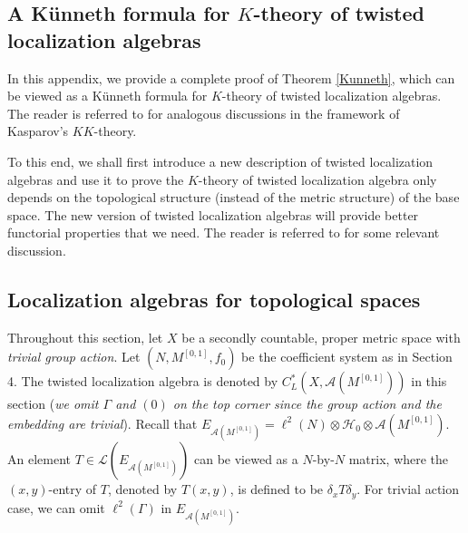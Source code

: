 \documentclass[11pt]{article}
\theoremstyle{definition}
\theoremstyle{plain}
\def\A{\mathcal A}\def\C{\mathcal C}\def\B{\mathcal B}\def\E{\mathcal E}\def\O{\mathcal O}\def\h{\mathfrak h}\def\K{\mathcal K}\def\F{\mathcal F}\def\P{\mathcal P}\def\L{\mathcal L}\def\R{\mathcal R}\def\Q{\mathcal Q}\def\H{\mathcal H}\def\S{\mathcal S}\def\N{\mathcal N}\def\U{\mathcal U}\def\V{\mathcal V}
\def\ox{\otimes}
\def\ox{\otimes}
\def\Ga{\Gamma}
\begin{document}
\begin{appendices}

\section{A K\"unneth formula for $K$-theory of twisted localization algebras}\label{Appendix A}

In this appendix, we provide a complete proof of Theorem \ref{Kunneth}, which can be viewed as a K\"unneth formula for $K$-theory of twisted localization algebras. The reader is referred to \cite{Duke1987} for analogous discussions in the framework of Kasparov's $KK$-theory.

To this end, we shall first introduce a new description of twisted localization algebras and use it to prove the $K$-theory of twisted localization algebra only depends on the topological structure (instead of the metric structure) of the base space. The new version of twisted localization algebras will provide better functorial properties that we need. The reader is referred to \cite{DWW2018} for some relevant discussion.


\subsection*{Localization algebras for topological spaces}

Throughout this section, let $X$ be a secondly countable, proper metric space with \emph{trivial group action}. Let $(N, M^{[0,1]},f_0)$ be the coefficient system as in Section 4. The twisted localization algebra is denoted by $C^*_L(X,\A(M^{[0,1]}))$ in this section (\emph{we omit $\Ga$ and $(0)$ on the top corner since the group action and the embedding are trivial}). Recall that $E_{\A(M^{[0,1]})}=\ell^2(N)\ox\H_0\ox\A(M^{[0,1]})$. An element $T\in\L(E_{\A(M^{[0,1]})})$ can be viewed as a $N$-by-$N$ matrix, where the $(x,y)$-entry of $T$, denoted by $T(x,y)$, is defined to be $\delta_xT\delta_y$. For trivial action case, we can omit $\ell^2(\Ga)$ in $E_{\A(M^{[0,1]})}$.


\end{appendices}
\end{document}
